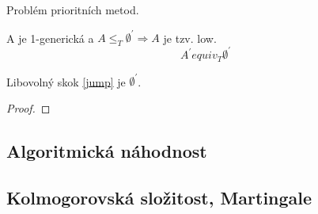 \begin{note}
	Problém prioritních metod.
\end{note}

\begin{theorem}[Low]
	A je 1-generická a $A \leq_T \emptyset^{\prime} \Rightarrow A$ je tzv. low.
	\[ A^{\prime} equiv_T \emptyset^{\prime} \]

	Libovolný skok \cref{jump} je $\emptyset^{\prime}$.
\end{theorem}
\begin{proof}
\end{proof}

\subsection{Algoritmická náhodnost}

\subsection{Kolmogorovská složitost, Martingale}
